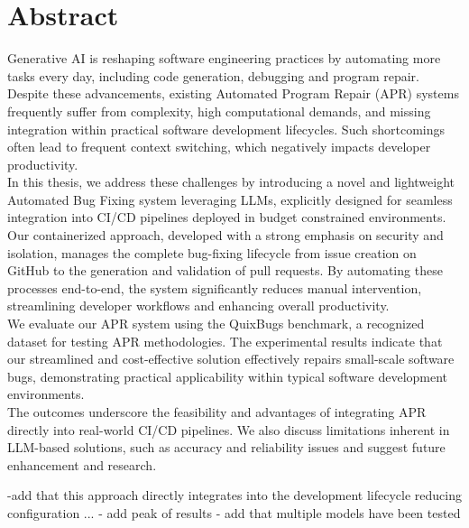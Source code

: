 \thispagestyle{empty}       %

\section*{Abstract}
Generative AI is reshaping software engineering practices by automating more tasks every day, including code generation, debugging and program repair. Despite these advancements, existing Automated Program Repair (APR) systems frequently suffer from complexity, high computational demands, and missing integration within practical software development lifecycles. Such shortcomings often lead to frequent context switching, which negatively impacts developer productivity. \\
In this thesis, we address these challenges by introducing a novel and lightweight Automated Bug Fixing system leveraging LLMs, explicitly designed for seamless integration into CI/CD pipelines deployed in budget constrained environments. Our containerized approach, developed with a strong emphasis on security and isolation, manages the complete bug-fixing lifecycle from issue creation on GitHub to the generation and validation of pull requests. By automating these processes end-to-end, the system significantly reduces manual intervention, streamlining developer workflows and enhancing overall productivity.\\
We evaluate our APR system using the QuixBugs benchmark, a recognized dataset for testing APR methodologies. The experimental results indicate that our streamlined and cost-effective solution effectively repairs small-scale software bugs, demonstrating practical applicability within typical software development environments. \\
The outcomes underscore the feasibility and advantages of integrating APR directly into real-world CI/CD pipelines. We also discuss limitations inherent in LLM-based solutions, such as accuracy and reliability issues and suggest future enhancement and research.


-add that this approach directly integrates into the development lifecycle reducing configuration ...
- add peak of results
- add that multiple models have been tested 